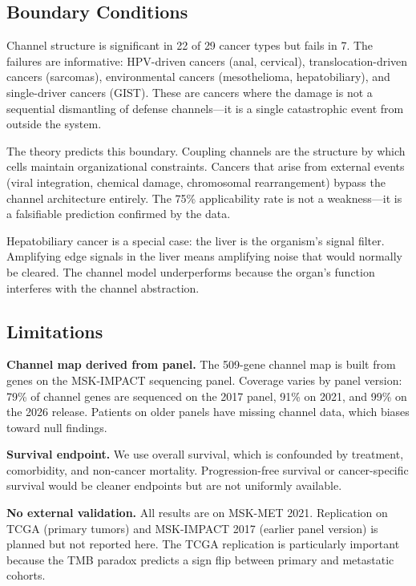\documentclass[11pt]{article}
\begin{document}
\subsection{Boundary Conditions}

Channel structure is significant in 22 of 29 cancer types but
fails in 7. The failures are informative: HPV-driven cancers
(anal, cervical), translocation-driven cancers (sarcomas),
environmental cancers (mesothelioma, hepatobiliary), and
single-driver cancers (GIST). These are cancers where the
damage is not a sequential dismantling of defense
channels---it is a single catastrophic event from outside the
system.

The theory predicts this boundary. Coupling channels are the
structure by which cells maintain organizational constraints.
Cancers that arise from external events (viral integration,
chemical damage, chromosomal rearrangement) bypass the channel
architecture entirely. The 75\% applicability rate is not a
weakness---it is a falsifiable prediction confirmed by the data.

Hepatobiliary cancer is a special case: the liver is the
organism's signal filter. Amplifying edge signals in the liver
means amplifying noise that would normally be cleared. The
channel model underperforms because the organ's function
interferes with the channel abstraction.

\subsection{Limitations}

\textbf{Channel map derived from panel.} The 509-gene channel
map is built from genes on the MSK-IMPACT sequencing panel.
Coverage varies by panel version: 79\% of channel genes are
sequenced on the 2017 panel, 91\% on 2021, and 99\% on the 2026
release. Patients on older panels have missing channel data,
which biases toward null findings.

\textbf{Survival endpoint.} We use overall survival, which is
confounded by treatment, comorbidity, and non-cancer mortality.
Progression-free survival or cancer-specific survival would be
cleaner endpoints but are not uniformly available.

\textbf{No external validation.} All results are on MSK-MET
2021. Replication on TCGA (primary tumors) and MSK-IMPACT 2017
(earlier panel version) is planned but not reported here. The
TCGA replication is particularly important because the TMB
paradox predicts a sign flip between primary and metastatic
cohorts.
\end{document}
